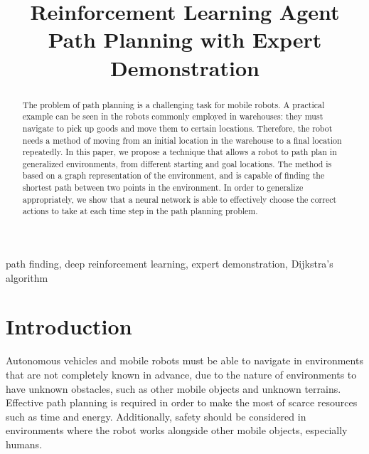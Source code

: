 \documentclass[conference]{IEEEtran}
\begin{document}
\title{Reinforcement Learning Agent Path Planning with Expert Demonstration}


\maketitle
\begin{abstract}
    The problem of path planning is a challenging task for mobile robots. A
    practical example can be seen in the robots commonly employed in warehouses:
    they must navigate to pick up goods and move them to certain locations.
    Therefore, the robot needs a method of moving from an initial location in
    the warehouse to a final location repeatedly. In this paper, we propose a
    technique that allows a robot to path plan in generalized environments, from
    different starting and goal locations. The method is based on a graph
    representation of the environment, and is capable of finding the shortest
    path between two points in the environment. In order to generalize
    appropriately, we show that a neural network is able to effectively choose
    the correct actions to take at each time step in the path planning problem.
\end{abstract}

\begin{IEEEkeywords}
    path finding, deep reinforcement learning, expert demonstration, Dijkstra's
    algorithm
\end{IEEEkeywords}

\section{Introduction}
Autonomous vehicles and mobile robots must be able to navigate in environments
that are not completely known in advance, due to the nature of environments to
have unknown obstacles, such as other mobile objects and unknown terrains.
Effective path planning is required in order to make the most of scarce
resources such as time and energy. Additionally, safety should be considered in
environments where the robot works alongside other mobile objects, especially
humans.
\end{document}
